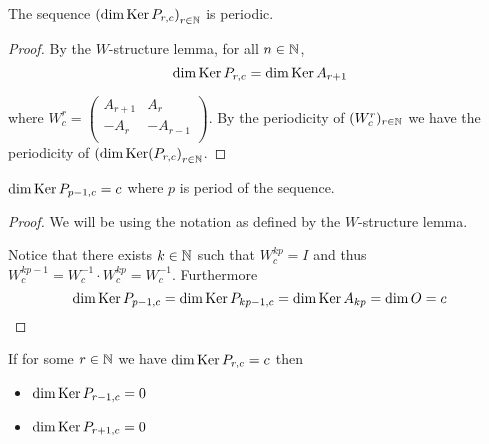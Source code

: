 \begin{proposition}
  The sequence $\left(\dim \operatorname{Ker} P_{r,c}\right)_{r\in\mathbb{N}}$
  is periodic.
\end{proposition}

\begin{proof}
  By the $W$-structure lemma, for all $n\in\mathbb{N}$,
  \[
  \dim\operatorname{Ker} P_{r,c}
  =
  \dim\operatorname{Ker} A_{r+1}
  \]

  where $W_{c}^{r}=\left(\begin{smallmatrix} A_{r+1} & A_{r}  \\ -A_{r} & -A_{r-1} \\\end{smallmatrix}\right)$.
  By the periodicity of $(W_{c}^{r})_{r\in\mathbb{N}}$ we have the
  periodicity of
  $\left(\dim\operatorname{Ker}(P_{r,c}\right)_{r\in\mathbb{N}}$.
\end{proof}

\begin{lemma}
  $\dim\operatorname{Ker} P_{p-1,c} = c$ where $p$ is period of the sequence.
\end{lemma}

\begin{proof}
  We will be using the notation as defined by the $W$-structure lemma.

  Notice that there exists $k\in\mathbb{N}$ such that $W_{c}^{kp} = I$ and
  thus $W_{c}^{kp-1} = W_{c}^{-1} \cdot W_{c}^{kp} = W_{c}^{-1}$.
  Furthermore
  \[
  \dim\operatorname{Ker} P_{p-1,c}
  =
  \dim\operatorname{Ker} P_{kp-1,c}
  =
  \dim\operatorname{Ker} A_{kp} = \dim O
  = c
  \]
\end{proof}

\begin{lemma}
  If for some $r\in\mathbb{N}$ we have $\dim\operatorname{Ker} P_{r,c} = c$ then
  \begin{itemize}
    \item $\dim\operatorname{Ker} P_{r-1,c} = 0$
    \item $\dim\operatorname{Ker} P_{r+1,c} = 0$
  \end{itemize}
\end{lemma}

